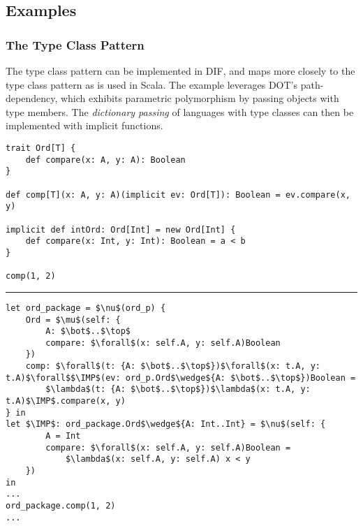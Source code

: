 \subsection{Examples}

\subsubsection{The Type Class Pattern}

The type class pattern \cite{OBLB18} can be implemented in DIF, and maps more
closely to the type class pattern as is used in Scala. The example leverages
DOT's path-dependency, which exhibits parametric polymorphism by passing
objects with type members. The \emph{dictionary passing} \cite{K88, WB89} of
languages with type classes can then be implemented with implicit functions.

\begin{minipage}{\textwidth}
\begin{lstlisting}[mathescape]
trait Ord[T] {
    def compare(x: A, y: A): Boolean
}

def comp[T](x: A, y: A)(implicit ev: Ord[T]): Boolean = ev.compare(x, y)

implicit def intOrd: Ord[Int] = new Ord[Int] {
    def compare(x: Int, y: Int): Boolean = a < b
}

comp(1, 2)
\end{lstlisting}
\end{minipage}

\hrule

\begin{minipage}{\textwidth}
\begin{lstlisting}[mathescape]
let ord_package = $\nu$(ord_p) {
    Ord = $\mu$(self: {
        A: $\bot$..$\top$
        compare: $\forall$(x: self.A, y: self.A)Boolean
    })
    comp: $\forall$(t: {A: $\bot$..$\top$})$\forall$(x: t.A, y: t.A)$\forall$$\IMP$(ev: ord_p.Ord$\wedge${A: $\bot$..$\top$})Boolean =
        $\lambda$(t: {A: $\bot$..$\top$})$\lambda$(x: t.A, y: t.A)$\IMP$.compare(x, y)
} in
let $\IMP$: ord_package.Ord$\wedge${A: Int..Int} = $\nu$(self: {
        A = Int
        compare: $\forall$(x: self.A, y: self.A)Boolean =
            $\lambda$(x: self.A, y: self.A) x < y
    })
in
...
ord_package.comp(1, 2)
...
\end{lstlisting}
\end{minipage}
